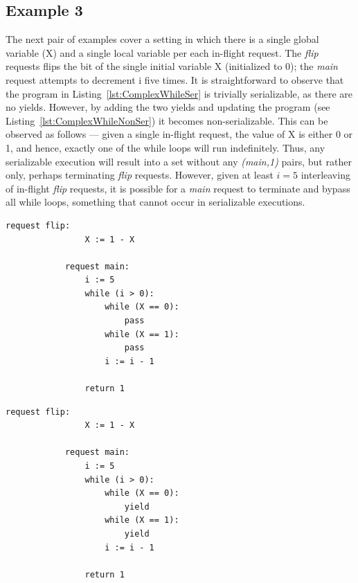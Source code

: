 \subsection{Example 3}

The next pair of examples cover a setting in which there is a single global variable (X) and a single local variable per each in-flight request. The \textit{flip} requests flips the bit of the single initial variable X (initialized to 0); the \textit{main} request attempts to decrement i five times.
%
It is straightforward to observe that the program in Listing~\ref{lst:ComplexWhileSer} is trivially serializable, as there are no yields.
%
However, by adding the two yields and updating the program (see Listing~\ref{lst:ComplexWhileNonSer}) it becomes non-serializable. This can be observed as follows --- given a single in-flight request, the value of X is either 0 or 1, and hence, exactly one of the while loops will run indefinitely. Thus, any serializable execution will result into a set without any \textit{(main,1)} pairs, but rather only, perhaps terminating \textit{flip} requests.
%
However, given at least $i=5$ interleaving of in-flight \textit{flip} requests, it is possible for a \textit{main} request to terminate and bypass all while loops, something that cannot occur in serializable executions.


\noindent
\begin{minipage}[t]{0.45\textwidth}
	\begin{lstlisting}[caption={Complex while (serializable)},
		label={lst:ComplexWhileSer}]
		    request flip: 
		        X := 1 - X 
		    
		    request main:
		        i := 5
		        while (i > 0):
		            while (X == 0):
		                pass
		            while (X == 1):
		                pass
		            i := i - 1
		        
		        return 1       
				\end{lstlisting}
\end{minipage}%
\hfill
\begin{minipage}[t]{0.45\textwidth}
	\begin{lstlisting}[caption={Complex while with yields (not serializable)},
		label={lst:ComplexWhileNonSer}]
		    request flip: 
		        X := 1 - X 
		
		    request main:
		        i := 5
		        while (i > 0):
		            while (X == 0):
		                yield
		            while (X == 1):
		                yield
		            i := i - 1
		
		        return 1        
					\end{lstlisting}
\end{minipage}
	
